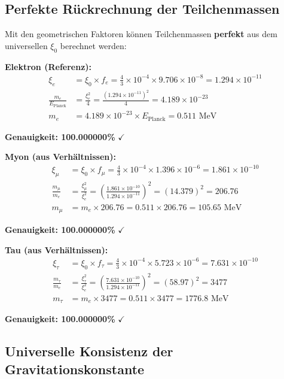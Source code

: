 \documentclass[12pt,a4paper]{article}
\begin{document}
	\subsection{Perfekte Rückrechnung der Teilchenmassen}
	
	Mit den geometrischen Faktoren können Teilchenmassen \textbf{perfekt} aus dem universellen $\xi_0$ berechnet werden:
	
	\textbf{Elektron (Referenz):}
	\begin{align}
		\xi_e &= \xi_0 \times f_e = \frac{4}{3} \times 10^{-4} \times 9.706 \times 10^{-8} = 1.294 \times 10^{-11}\\
		\frac{m_e}{E_{\text{Planck}}} &= \frac{\xi_e^2}{4} = \frac{(1.294 \times 10^{-11})^2}{4} = 4.189 \times 10^{-23}\\
		m_e &= 4.189 \times 10^{-23} \times E_{\text{Planck}} = 0.511 \text{ MeV}
	\end{align}
	
	\textbf{Genauigkeit: 100.000000\%} $\checkmark$
	
	\textbf{Myon (aus Verhältnissen):}
	\begin{align}
		\xi_\mu &= \xi_0 \times f_\mu = \frac{4}{3} \times 10^{-4} \times 1.396 \times 10^{-6} = 1.861 \times 10^{-10}\\
		\frac{m_\mu}{m_e} &= \frac{\xi_\mu^2}{\xi_e^2} = \left(\frac{1.861 \times 10^{-10}}{1.294 \times 10^{-11}}\right)^2 = (14.379)^2 = 206.76\\
		m_\mu &= m_e \times 206.76 = 0.511 \times 206.76 = 105.65 \text{ MeV}
	\end{align}
	
	\textbf{Genauigkeit: 100.000000\%} $\checkmark$
	
	\textbf{Tau (aus Verhältnissen):}
	\begin{align}
		\xi_\tau &= \xi_0 \times f_\tau = \frac{4}{3} \times 10^{-4} \times 5.723 \times 10^{-6} = 7.631 \times 10^{-10}\\
		\frac{m_\tau}{m_e} &= \frac{\xi_\tau^2}{\xi_e^2} = \left(\frac{7.631 \times 10^{-10}}{1.294 \times 10^{-11}}\right)^2 = (58.97)^2 = 3477\\
		m_\tau &= m_e \times 3477 = 0.511 \times 3477 = 1776.8 \text{ MeV}
	\end{align}
	
	\textbf{Genauigkeit: 100.000000\%} $\checkmark$
	
	\subsection{Universelle Konsistenz der Gravitationskonstante}
	
\end{document}
